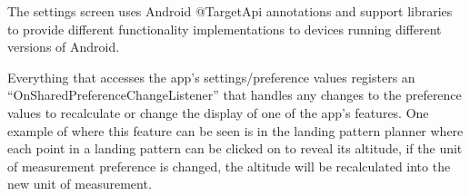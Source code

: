The settings screen uses Android @TargetApi annotations and support libraries to provide different functionality implementations to devices running different versions of Android.

Everything that accesses the app's settings/preference values registers an ``OnSharedPreference\-ChangeListener'' that handles any changes to the preference values to recalculate or change the display of one of the app's features. One example of where this feature can be seen is in the landing pattern planner where each point in a landing pattern can be clicked on to reveal its altitude, if the unit of measurement preference is changed, the altitude will be recalculated into the new unit of measurement.

